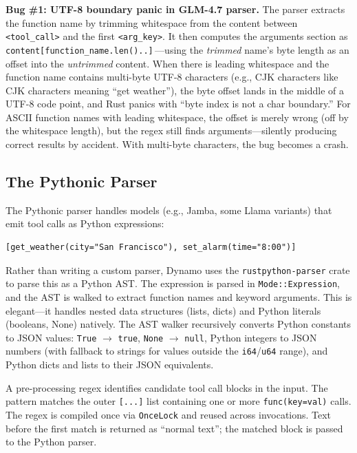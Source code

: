 \begin{bugbox}
\textbf{Bug \#1: UTF-8 boundary panic in GLM-4.7 parser.} The parser extracts the function name by trimming whitespace from the content between \texttt{<tool\_call>} and the first \texttt{<arg\_key>}. It then computes the arguments section as \texttt{content[function\_name.len()..]}\,---using the \emph{trimmed} name's byte length as an offset into the \emph{untrimmed} content. When there is leading whitespace and the function name contains multi-byte UTF-8 characters (e.g., CJK characters like CJK characters meaning ``get weather''), the byte offset lands in the middle of a UTF-8 code point, and Rust panics with ``byte index is not a char boundary.'' For ASCII function names with leading whitespace, the offset is merely wrong (off by the whitespace length), but the regex still finds arguments---silently producing correct results by accident. With multi-byte characters, the bug becomes a crash.
\end{bugbox}

\subsection{The Pythonic Parser}

The Pythonic parser handles models (e.g., Jamba, some Llama variants) that emit tool calls as Python expressions:

\begin{verbatim}
[get_weather(city="San Francisco"), set_alarm(time="8:00")]
\end{verbatim}

Rather than writing a custom parser, Dynamo uses the \texttt{rustpython-parser} crate to parse this as a Python AST. The expression is parsed in \texttt{Mode::Expression}, and the AST is walked to extract function names and keyword arguments. This is elegant---it handles nested data structures (lists, dicts) and Python literals (booleans, None) natively. The AST walker recursively converts Python constants to JSON values: \texttt{True} $\rightarrow$ \texttt{true}, \texttt{None} $\rightarrow$ \texttt{null}, Python integers to JSON numbers (with fallback to strings for values outside the \texttt{i64}/\texttt{u64} range), and Python dicts and lists to their JSON equivalents.

A pre-processing regex identifies candidate tool call blocks in the input. The pattern matches the outer \texttt{[...]} list containing one or more \texttt{func(key=val)} calls. The regex is compiled once via \texttt{OnceLock} and reused across invocations. Text before the first match is returned as ``normal text''; the matched block is passed to the Python parser.

